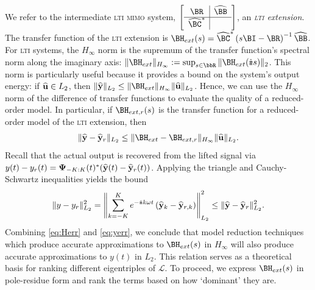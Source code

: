 \documentclass[pdflatex,sn-mathphys-num]{sn-jnl}%
\theoremstyle{thmstyleone}%
\theoremstyle{thmstyletwo}%
\theoremstyle{thmstylethree}%
\def\Bu{{\bf u}}  \def\BU{{\bf U}}
\def\By{{\bf y}}  \def\BY{{\bf Y}}
\def\ii{\dot{\imath\!\imath}}
\def\Lop{\mathscr{L}}
\def\BPsi{{\boldsymbol{\Psi}}}
\begin{document}
We refer to the intermediate \textsc{lti} \textsc{mimo} system, $\left[ \begin{array}{c|c}
\BR &  \widehat{\BB} \\  \hline
\widehat{\BC}^* & 
\end{array} \right]$, an {\it{\textsc{lti} extension}}. The transfer function of the \textsc{lti} extension is $\BH_{ext}(s) = \widehat{\BC}^*\left(s\BI-\BR\right)^{-1}\widehat{\BB}$. For \textsc{lti} systems, the $H_\infty$ norm is the supremum of the transfer function's spectral norm along the imaginary axis: $\|\BH_{ext}\|_{H_\infty}:= \sup_{s\in \bbR}\|\BH_{ext}(\ii s)\|_{2}$. This norm is particularly useful because it provides a bound on the system's output energy: if $\widehat{\Bu}\in L_2$, then $\|\widehat{\By}\|_{L_2} \leq \|\BH_{ext}\|_{H_\infty}\|\widehat{\Bu}\|_{L_2}$. Hence, we can use the $H_\infty$ norm of the difference of transfer functions to evaluate the quality of a reduced-order model. In particular, if $\BH_{ext,r}(s)$ is the transfer function for a reduced-order model of the \textsc{lti} extension, then 
\begin{equation}
\label{eq:Herr}
    \|\widehat{\By}-\widehat{\By}_r\|_{L_2} \leq \|\BH_{ext}-\BH_{ext,r}\|_{H_\infty}\|\widehat{\Bu}\|_{L_2}.
\end{equation}
Recall that the actual output is recovered from the lifted signal via $y(t)-y_r(t) =  \BPsi_{-K:K}(t)^*(\widehat{\By}(t)-\widehat{\By}_r(t))$. Applying the triangle and Cauchy-Schwartz inequalities yields the bound
\begin{equation}
\label{eq:yerr}
    \|y-y_r\|_{L_2}^2 
    =
    \left\|\sum_{k=-K}^K e^{-\ii k\omega t}\left(\widehat{\By}_k-\widehat{\By}_{r,k}\right)\right\|_{L_2}^2 
    \leq
    \|\widehat{\By}-\widehat{\By}_r\|_{L_2}^2.
\end{equation}
Combining \eqref{eq:Herr} and \eqref{eq:yerr}, we conclude that model reduction techniques which produce accurate approximations to $\BH_{ext}(s)$ in $H_\infty$ will also produce accurate approximations to $y(t)$ in $L_2$. This relation serves as a theoretical basis for ranking different eigentriples of $\Lop$. To proceed, we express $\BH_{ext}(s)$ in pole-residue form and rank the terms based on how `dominant' they are.
\end{document}
